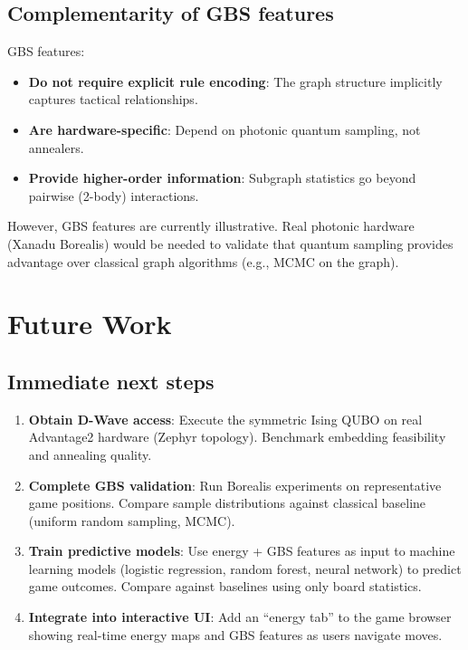 \documentclass[aps,prl,reprint]{revtex4-2}
\begin{document}
\subsection{Complementarity of GBS features}

GBS features:
\begin{itemize}
	\item \textbf{Do not require explicit rule encoding}: The graph structure implicitly captures tactical relationships.
	\item \textbf{Are hardware-specific}: Depend on photonic quantum sampling, not annealers.
	\item \textbf{Provide higher-order information}: Subgraph statistics go beyond pairwise (2-body) interactions.
\end{itemize}

However, GBS features are currently illustrative. Real photonic hardware (Xanadu Borealis) would be needed to validate that quantum sampling provides advantage over classical graph algorithms (e.g., MCMC on the graph).

\section{Future Work}

\subsection{Immediate next steps}

\begin{enumerate}
	\item \textbf{Obtain D-Wave access}: Execute the symmetric Ising QUBO on real Advantage2 hardware (Zephyr topology). Benchmark embedding feasibility and annealing quality.
	
	\item \textbf{Complete GBS validation}: Run Borealis experiments on representative game positions. Compare sample distributions against classical baseline (uniform random sampling, MCMC).
	
	\item \textbf{Train predictive models}: Use energy + GBS features as input to machine learning models (logistic regression, random forest, neural network) to predict game outcomes. Compare against baselines using only board statistics.
	
	\item \textbf{Integrate into interactive UI}: Add an ``energy tab'' to the game browser showing real-time energy maps and GBS features as users navigate moves.
\end{enumerate}
\end{document}
